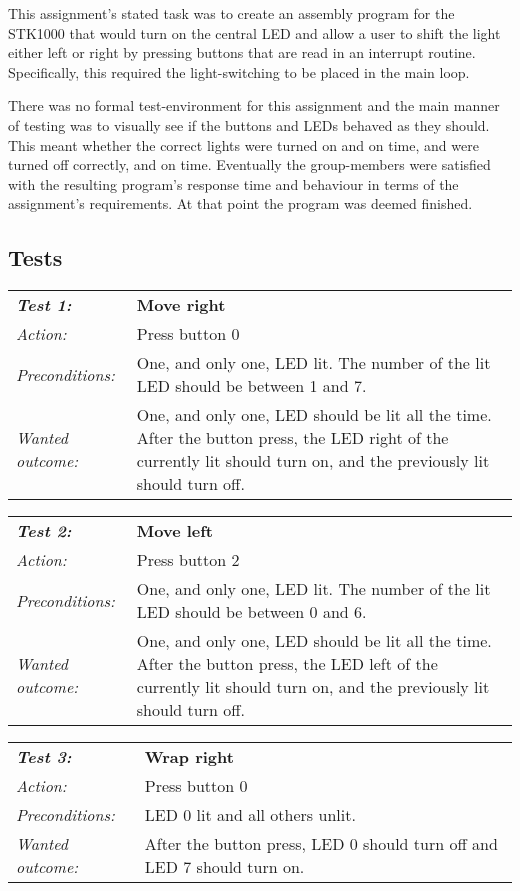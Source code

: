 This assignment’s stated task was to create an assembly program for the STK1000 that would turn on the central LED and allow a user to shift the light either left or right by pressing buttons that are read in an interrupt routine. Specifically, this required the light-switching to be placed in the main loop.

There was no formal test-environment for this assignment and the main manner of testing was to visually see if the buttons and LEDs behaved as they should. This meant whether the correct lights were turned on and on time, and were turned off correctly, and on time. 
Eventually the group-members were satisfied with the resulting program’s response time and behaviour in terms of the assignment’s requirements. At that point the program was deemed finished.

\subsection{Tests}

\begin{tabular}[h]{lp{12cm}} \hline
\textbf{\emph{Test 1:}} 		& \textbf{Move right}\\
\emph{Action:} 		& Press button 0\\
\emph{Preconditions:}	& One, and only one, LED lit. The number of the lit LED should be between 1 and 7.\\
\emph{Wanted outcome:}	& One, and only one, LED should be lit all the time. After the button press, the LED right of the currently lit should turn on, and the previously lit should turn off.\\ \hline
\end{tabular}


\begin{tabular}[h]{lp{12cm}} \hline
\textbf{\emph{Test 2:}} 		& \textbf{Move left}\\
\emph{Action:} 		& Press button 2\\
\emph{Preconditions:}	& One, and only one, LED lit. The number of the lit LED should be between 0 and 6.\\
\emph{Wanted outcome:}	& One, and only one, LED should be lit all the time. After the button press, the LED left of the currently lit should turn on, and the previously lit should turn off. \\ \hline
\end{tabular}

\begin{tabular}[h]{lp{12cm}} \hline
\textbf{\emph{Test 3:}} 		& \textbf{Wrap right}\\
\emph{Action:} 		& Press button 0\\
\emph{Preconditions:}	& LED 0 lit and all others unlit.\\
\emph{Wanted outcome:}	& After the button press, LED 0 should turn off and LED 7 should turn on.\\ \hline
\end{tabular}

